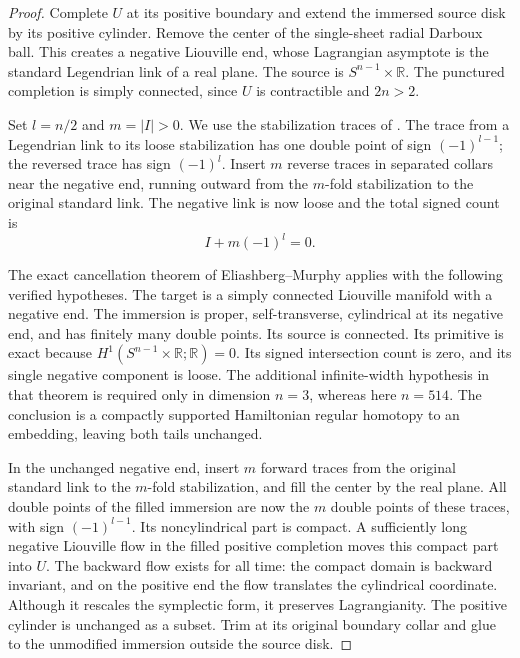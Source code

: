 \documentclass[11pt]{article}
\numberwithin{equation}{section}
\theoremstyle{definition}
\theoremstyle{remark}
\newcommand{\R}{\mathbb R}
\begin{document}
\begin{proof}
Complete $U$ at its positive boundary and extend the immersed
source disk by its positive cylinder.  Remove the center of
the single-sheet radial Darboux ball.  This creates a negative
Liouville end, whose Lagrangian asymptote is the standard
Legendrian link of a real plane.  The source is
$S^{n-1}\times\R$.  The punctured completion is simply
connected, since $U$ is contractible and $2n>2$.

Set $l=n/2$ and $m=|I|>0$.  We use the stabilization traces
of \cite[Lemma~3.2 and proof of Lemma~3.4]{Top:EEMS}.
The trace from a Legendrian link to its loose stabilization
has one double point of sign $(-1)^{l-1}$; the reversed
trace has sign $(-1)^l$.  Insert $m$ reverse traces in
separated collars near the negative end, running outward
from the $m$-fold stabilization to the original standard
link.  The negative link is now loose and the total signed
count is
\[
           I+m(-1)^l=0.
\]

The exact cancellation theorem of Eliashberg--Murphy
\cite[Theorem~2.3]{Top:EMcaps} applies with the following
verified hypotheses.  The target is a simply connected
Liouville manifold with a negative end.  The immersion is
proper, self-transverse, cylindrical at its negative end,
and has finitely many double points.  Its source is
connected.  Its primitive is exact because
$H^1(S^{n-1}\times\R;\R)=0$.  Its signed intersection
count is zero, and its single negative component is loose.
The additional infinite-width hypothesis in that theorem
is required only in dimension $n=3$, whereas here $n=514$.
The conclusion is a compactly supported Hamiltonian
regular homotopy to an embedding, leaving both tails
unchanged.

In the unchanged negative end, insert $m$ forward traces
from the original standard link to the $m$-fold
stabilization, and fill the center by the real plane.
All double points of the filled immersion are now the
$m$ double points of these traces, with sign
$(-1)^{l-1}$.  Its noncylindrical part is compact.  A
sufficiently long negative Liouville flow in the filled
positive completion moves this compact part into $U$.
The backward flow exists for all time: the compact domain
is backward invariant, and on the positive end the flow
translates the cylindrical coordinate.  Although it
rescales the symplectic form, it preserves Lagrangianity.
The positive cylinder is unchanged as a subset.  Trim at
its original boundary collar and glue to the unmodified
immersion outside the source disk.


\end{proof}
\end{document}
